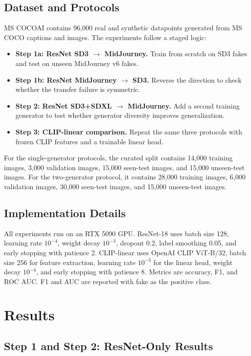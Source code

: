 \documentclass[conference]{IEEEtran}
\begin{document}
\subsection{Dataset and Protocols}

MS COCOAI contains 96,000 real and synthetic datapoints generated from MS COCO
captions and images. The experiments follow a staged logic:
\begin{itemize}
    \item \textbf{Step 1a: ResNet SD3 $\rightarrow$ MidJourney.} Train from
    scratch on SD3 fakes and test on unseen MidJourney v6 fakes.
    \item \textbf{Step 1b: ResNet MidJourney $\rightarrow$ SD3.} Reverse the
    direction to check whether the transfer failure is symmetric.
    \item \textbf{Step 2: ResNet SD3+SDXL $\rightarrow$ MidJourney.} Add a
    second training generator to test whether generator diversity improves
    generalization.
    \item \textbf{Step 3: CLIP-linear comparison.} Repeat the same three
    protocols with frozen CLIP features and a trainable linear head.
\end{itemize}
For the single-generator protocols, the curated split contains 14,000 training
images, 3,000 validation images, 15,000 seen-test images, and 15,000
unseen-test images. For the two-generator protocol, it contains 28,000
training images, 6,000 validation images, 30,000 seen-test images, and 15,000
unseen-test images.

\subsection{Implementation Details}

All experiments run on an RTX 5090 GPU. ResNet-18 uses batch size 128, learning
rate $10^{-4}$, weight decay $10^{-3}$, dropout 0.2, label smoothing 0.05, and
early stopping with patience 2. CLIP-linear uses OpenAI CLIP ViT-B/32, batch
size 256 for feature extraction, learning rate $10^{-3}$ for the linear head,
weight decay $10^{-4}$, and early stopping with patience 8. Metrics are
accuracy, F1, and ROC AUC. F1 and AUC are reported with fake as the positive
class.

\section{Results}

\subsection{Step 1 and Step 2: ResNet-Only Results}
\end{document}
